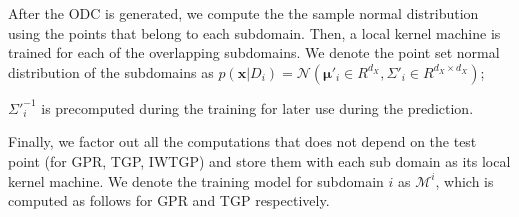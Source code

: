 After the ODC is generated, we compute the the sample normal distribution using the points that belong to each subdomain. Then, a local kernel machine is trained for each of the overlapping subdomains. We denote the point set normal distribution of the subdomains as $p(\mathbf{x}|D_i) = \mathcal{N}(\boldsymbol{\mu}'_i \in R^{d_X}, \Sigma'_i \in R^{d_X \times d_X})$;
 ${\Sigma'}_i^{-1}$ is precomputed during the training for later use during the prediction.  Finally, we factor out all the computations that does not depend on the test point (for GPR, TGP, IWTGP) and store them with each sub domain as its local kernel machine. We denote the training model for subdomain $i$ as $\mathcal{M}^i$, which is computed as follows for GPR and TGP respectively.%



